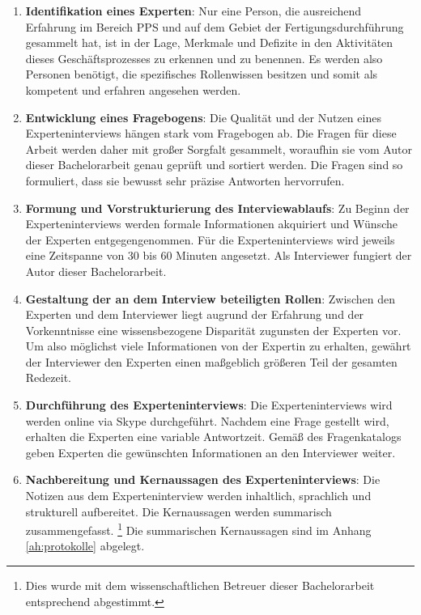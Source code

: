 \begin{enumerate}
    \item 
    \textbf{Identifikation eines Experten}: Nur eine Person, die ausreichend Erfahrung im Bereich \ac{PPS} und auf dem Gebiet der Fertigungsdurchführung gesammelt hat, ist in der Lage, Merkmale und Defizite in den Aktivitäten dieses Geschäftsprozesses zu erkennen und zu benennen. Es werden also Personen benötigt, die spezifisches Rollenwissen besitzen und somit als kompetent und erfahren angesehen werden. \cite{Mieg.2005}
    \item
    \textbf{Entwicklung eines Fragebogens}: Die Qualität und der Nutzen eines Experteninterviews hängen stark vom Fragebogen ab. Die Fragen für diese Arbeit werden daher mit großer Sorgfalt gesammelt, woraufhin sie vom Autor dieser Bachelorarbeit genau geprüft und sortiert werden. Die Fragen sind so formuliert, dass sie bewusst sehr präzise Antworten hervorrufen.
    \item
    \textbf{Formung und Vorstrukturierung des Interviewablaufs}: Zu Beginn der Experteninterviews werden formale Informationen akquiriert und Wünsche der Experten entgegengenommen. 
    Für die Experteninterviews wird jeweils eine Zeitspanne von 30 bis 60 Minuten angesetzt. Als Interviewer fungiert der Autor dieser Bachelorarbeit.
    \item
    \textbf{Gestaltung der an dem Interview beteiligten Rollen}: Zwischen den Experten und dem Interviewer liegt augrund der Erfahrung und der Vorkenntnisse eine wissensbezogene Disparität zugunsten der Experten vor. Um also möglichst viele Informationen von der Expertin zu erhalten, gewährt der Interviewer den Experten einen maßgeblich größeren Teil der gesamten Redezeit.
    \item
   \textbf{ Durchführung des Experteninterviews}: Die Experteninterviews wird werden online via Skype durchgeführt. Nachdem eine Frage gestellt wird, erhalten die Experten eine variable Antwortzeit. Gemäß des Fragenkatalogs geben Experten die gewünschten Informationen an den Interviewer weiter.
    \item
    \textbf{Nachbereitung und Kernaussagen des Experteninterviews}: Die Notizen aus dem Experteninterview werden inhaltlich, sprachlich und strukturell aufbereitet. Die Kernaussagen werden summarisch zusammengefasst. \footnote{Dies wurde mit dem wissenschaftlichen Betreuer dieser Bachelorarbeit entsprechend abgestimmt.} Die summarischen Kernaussagen sind im Anhang \ref{ah:protokolle} abgelegt.
\end{enumerate}

